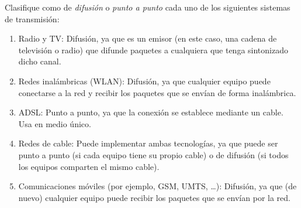 \begin{ejercicio}
    Clasifique como de \textit{difusión} o \textit{punto a punto} cada uno de los siguientes sistemas de transmisión:
    \begin{enumerate}
        \item Radio y TV\@: Difusión, ya que es un emisor (en este caso, una cadena de televisión o radio) que difunde paquetes a cualquiera que tenga sintonizado dicho canal.
        \item Redes inalámbricas (\acrshort{WLAN}): Difusión, ya que cualquier equipo puede conectarse a la red y recibir los paquetes que se envían de forma inalámbrica.
        \item ADSL\@: Punto a punto, ya que la conexión se establece mediante un cable. Usa en medio único.
        \item Redes de cable: Puede implementar ambas tecnologías, ya que puede ser punto a punto (si cada equipo tiene su propio cable) o de difusión (si todos los equipos comparten el mismo cable).
        \item Comunicaciones móviles (por ejemplo, GSM\@, UMTS\@, \ldots): Difusión, ya que (de nuevo) cualquier equipo puede recibir los paquetes que se envían por la red.
    \end{enumerate}
\end{ejercicio}

